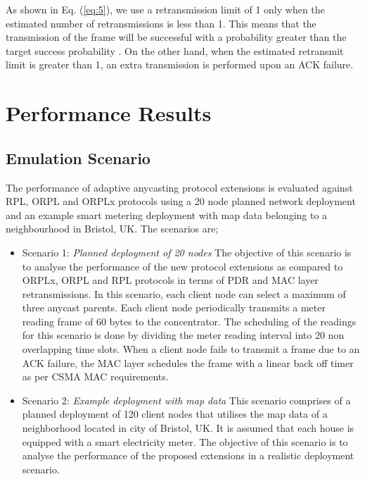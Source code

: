 \documentclass[conference]{IEEEtran}
\begin{document}
As shown in Eq. (\ref{eq:5}), we use a retransmission limit of 1
only when the estimated number of retransmissions is less than 1.
This means that the transmission of the frame will be successful
with a probability greater than the target success probability
. On the other hand, when the estimated retransmit limit is
greater than 1, an extra transmission is performed upon an ACK failure.


\section{Performance Results}\label{evaluation}
\subsection {Emulation Scenario}
The performance of adaptive anycasting protocol extensions is evaluated against RPL, ORPL and ORPLx protocols using a 20 node planned network deployment and an example smart metering deployment with map data belonging to a neighbourhood in Bristol, UK. The scenarios are;
\begin{itemize}
\item{Scenario 1: \emph{Planned deployment of 20 nodes}}
The objective of this scenario is to analyse the performance of the new protocol extensions as compared to ORPLx, ORPL and RPL protocols in terms of PDR and MAC layer retransmissions. In this scenario, each client node can select a maximum of three anycast parents. Each client node periodically transmits a meter reading frame of 60 bytes to the concentrator. The scheduling of the readings for this scenario is done by dividing the meter reading interval into 20 non overlapping time slots. When a client node fails to transmit a frame due to an ACK failure, the MAC layer schedules the frame with a linear back
off timer as per CSMA MAC requirements.

\item{Scenario 2:  \emph{Example deployment with map data}}
This scenario comprises of a planned deployment of 120 client nodes that utilises the map data of a neighborhood located in city of Bristol, UK. It is assumed that each house is equipped with a smart electricity meter. The objective of this scenario is to analyse the performance of the proposed extensions in a realistic deployment scenario.

\end{itemize}
\end{document}
